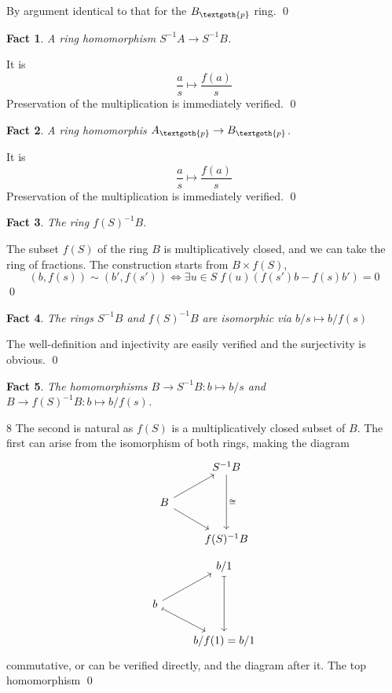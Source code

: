 \documentclass{article}
\newtheorem{theorem}{Fact}[section]
\begin{document}
\noindent
By argument identical to that for the $B_\textgoth{p}$ ring.
\qed

\bigskip
\begin{theorem}
A ring homomorphism $S^{-1}A \rightarrow S^{-1}B$.
\end{theorem}

\noindent
It is 
\[
\frac{a}{s} \mapsto \frac{f(a)}{s}
\]
Preservation of the multiplication is immediately verified.
\qed

\bigskip
\begin{theorem}
A ring homomorphis $A_\textgoth{p} \rightarrow B_\textgoth{p}$.
\end{theorem}

\noindent
It is 
\[
\frac{a}{s} \mapsto \frac{f(a)}{s}
\]
Preservation of the multiplication is immediately verified.
\qed

\bigskip
\begin{theorem}
The ring $f(S)^{-1}B$.
\end{theorem}

\noindent
The subset $f(S)$ of the ring $B$ is multiplicatively closed, and we can take the ring of fractions. The construction starts from $B \times f(S)$,
\[
(b, f(s)) \sim (b', f(s')) \iff \exists u \in S \; f(u)(f(s')b - f(s)b') = 0
\]
\qed

\bigskip
\begin{theorem}
The rings $S^{-1}B$ and $f(S)^{-1}B$ are isomorphic via $b/s \mapsto b/f(s)$
\end{theorem}

\noindent
The well-definition and injectivity are easily verified and the surjectivity is obvious.
\qed

\bigskip
\begin{theorem}
The homomorphisms $B \rightarrow S^{-1}B: b \mapsto b/s$ and $B \rightarrow f(S)^{-1}B: b \mapsto b/f(s)$.
\end{theorem}
8
\noindent
The second is natural as $f(S)$ is a multiplicatively closed subset of $B$. The first can arise from the isomorphism of both rings, making the diagram
\[
\begin{tikzcd}
  & S^{-1}B \arrow[dd, "\cong"] \\
  B \arrow[ur] \arrow[dr] \\
  & f(S)^{-1}B
\end{tikzcd}
\]
\[
\begin{tikzcd}
  & b/1 \arrow[dd, mapsto] \\
  b \arrow[ur] \arrow[dr, mapsto] \\
  & b/f(1) = b/1
\end{tikzcd}
\]
commutative, or can be verified directly, and the diagram after it. The top homomorphism 
\qed
\end{document}
